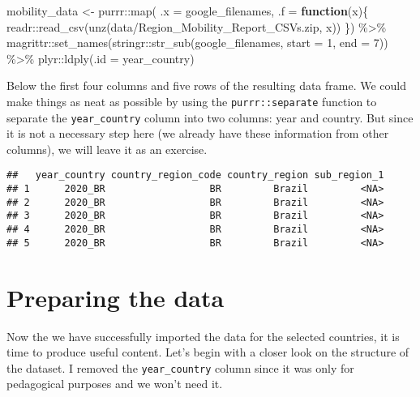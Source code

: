\documentclass[
]{book}
\newenvironment{Shaded}{\begin{snugshade}}{\end{snugshade}}
\newcommand{\AttributeTok}[1]{\textcolor[rgb]{0.77,0.63,0.00}{#1}}
\newcommand{\ControlFlowTok}[1]{\textcolor[rgb]{0.13,0.29,0.53}{\textbf{#1}}}
\newcommand{\DecValTok}[1]{\textcolor[rgb]{0.00,0.00,0.81}{#1}}
\newcommand{\FunctionTok}[1]{\textcolor[rgb]{0.00,0.00,0.00}{#1}}
\newcommand{\NormalTok}[1]{#1}
\newcommand{\OtherTok}[1]{\textcolor[rgb]{0.56,0.35,0.01}{#1}}
\newcommand{\SpecialCharTok}[1]{\textcolor[rgb]{0.00,0.00,0.00}{#1}}
\newcommand{\StringTok}[1]{\textcolor[rgb]{0.31,0.60,0.02}{#1}}
\begin{document}
\begin{Shaded}
\begin{Highlighting}[]
\NormalTok{mobility\_data }\OtherTok{\textless{}{-}} 
\NormalTok{  purrr}\SpecialCharTok{::}\FunctionTok{map}\NormalTok{(}
    \AttributeTok{.x =}\NormalTok{ google\_filenames, }
    \AttributeTok{.f =} \ControlFlowTok{function}\NormalTok{(x)\{}
\NormalTok{      readr}\SpecialCharTok{::}\FunctionTok{read\_csv}\NormalTok{(}\FunctionTok{unz}\NormalTok{(}\StringTok{\textquotesingle{}data/Region\_Mobility\_Report\_CSVs.zip\textquotesingle{}}\NormalTok{, x))}
\NormalTok{      \}) }\SpecialCharTok{\%\textgreater{}\%} 
\NormalTok{  magrittr}\SpecialCharTok{::}\FunctionTok{set\_names}\NormalTok{(stringr}\SpecialCharTok{::}\FunctionTok{str\_sub}\NormalTok{(google\_filenames, }\AttributeTok{start =} \DecValTok{1}\NormalTok{, }\AttributeTok{end =} \DecValTok{7}\NormalTok{)) }\SpecialCharTok{\%\textgreater{}\%} 
\NormalTok{  plyr}\SpecialCharTok{::}\FunctionTok{ldply}\NormalTok{(}\AttributeTok{.id =} \StringTok{\textquotesingle{}year\_country\textquotesingle{}}\NormalTok{)}
\end{Highlighting}
\end{Shaded}

Below the first four columns and five rows of the resulting data frame. We could make things as neat as possible by using the \texttt{purrr::separate} function to separate the \texttt{year\_country} column into two columns: year and country. But since it is not a necessary step here (we already have these information from other columns), we will leave it as an exercise.

\begin{verbatim}
##   year_country country_region_code country_region sub_region_1
## 1      2020_BR                  BR         Brazil         <NA>
## 2      2020_BR                  BR         Brazil         <NA>
## 3      2020_BR                  BR         Brazil         <NA>
## 4      2020_BR                  BR         Brazil         <NA>
## 5      2020_BR                  BR         Brazil         <NA>
\end{verbatim}

\hypertarget{preparing-the-data}{%
\section{Preparing the data}\label{preparing-the-data}}

Now the we have successfully imported the data for the selected countries, it is time to produce useful content. Let's begin with a closer look on the structure of the dataset. I removed the \texttt{year\_country} column since it was only for pedagogical purposes and we won't need it.
\end{document}
